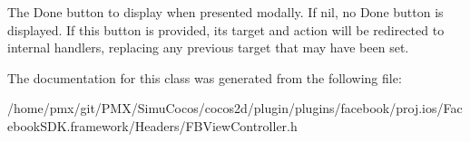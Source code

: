 The Done button to display when presented modally. If nil, no Done button is displayed. If this button is provided, its target and action will be redirected to internal handlers, replacing any previous target that may have been set. 

The documentation for this class was generated from the following file\+:\begin{DoxyCompactItemize}
\item 
/home/pmx/git/\+P\+M\+X/\+Simu\+Cocos/cocos2d/plugin/plugins/facebook/proj.\+ios/\+Facebook\+S\+D\+K.\+framework/\+Headers/F\+B\+View\+Controller.\+h\end{DoxyCompactItemize}
